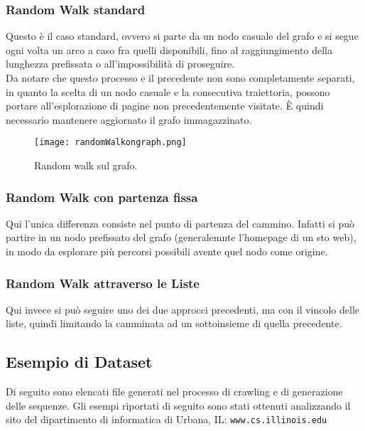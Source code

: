 \subsubsection{Random Walk standard}
Questo è il caso standard, ovvero si parte da un nodo casuale del grafo e si segue ogni volta un arco a caso fra quelli disponibili, fino al raggiungimento della lunghezza prefissata o all'impossibilità di proseguire.
\\
Da notare che questo processo e il precedente non sono completamente separati, in quanto la scelta di un nodo casuale e la consecutiva traiettoria, possono portare all'esplorazione di pagine non precedentemente visitate. È quindi necessario mantenere aggiornato il grafo immagazzinato.
\begin{figure}[htb]
	\centering
	\texttt{[image: randomWalkongraph.png]}
	\caption{Random walk sul grafo. }
	\label{englishchinese}
\end{figure}
\subsubsection{Random Walk con partenza fissa}
Qui l'unica differenza consiste nel punto di partenza del cammino. Infatti si può partire in un nodo prefissato del grafo (generalemnte l'homepage di un sto web), in modo da esplorare più percorsi possibili avente quel nodo come origine.

\subsubsection{Random Walk attraverso le Liste}
Qui invece si può seguire uno dei due approcci precedenti, ma con il vincolo delle liste, quindi limitando la camminata ad un sottoinsieme di quella precedente.

\subsection{Esempio di Dataset}
Di seguito sono elencati file generati nel processo di crawling e di generazione delle sequenze. Gli esempi riportati di seguito sono stati ottenuti analizzando il sito del dipartimento di informatica di Urbana, IL: \texttt{www.cs.illinois.edu}

